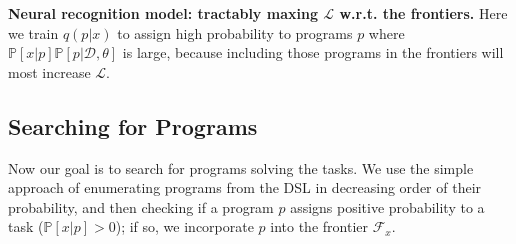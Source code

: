 \documentclass{article}
\newcommand{\lowerBound}{\mathscr{L}}
\newcommand{\probability}{\mathds{P}} %
\begin{document}
\textbf{Neural recognition model: tractably maxing $\lowerBound$ w.r.t. the
  frontiers.}  Here we train %
$q(p|x)$ to assign high probability to programs $p$ where
$\probability[x|p]\probability[p|\mathcal{D},\theta]$ is large, because including those programs
in the frontiers will most increase $\lowerBound$.  %





\subsection{Searching for Programs}\label{explorationSection}

Now our goal is to search for programs solving the tasks.  We use the simple approach of enumerating programs from
the DSL  in decreasing order of their probability,
and then checking if a program $p$ assigns positive
probability to a task ($\probability[x|p] > 0$); if so, we incorporate $p$ 
into the frontier $\mathcal{F}_x$.
\end{document}
